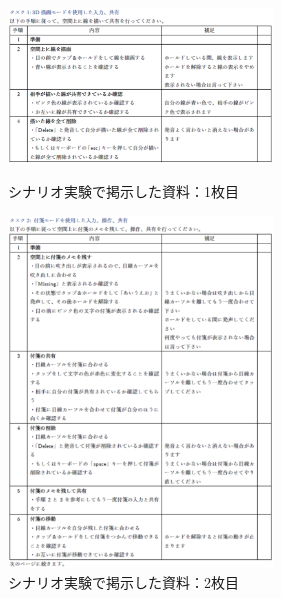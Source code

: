 \documentclass[11pt,a4j, titlepage]{jarticle} %
\begin{document}
\begin{figure}[htbp]
 \begin{minipage}{0.5\hsize}
  \begin{center}
   \includegraphics[width=70mm]{task1.eps}
  \end{center}
  \caption{シナリオ実験で掲示した資料：1枚目}
  \label{fig:task1}
 \end{minipage}
 \begin{minipage}{0.5\hsize}
  \begin{center}
   \includegraphics[width=70mm]{task2.eps}
  \end{center}
  \caption{シナリオ実験で掲示した資料：2枚目}
  \label{fig:task2}
 \end{minipage}
\end{figure}
\end{document}

